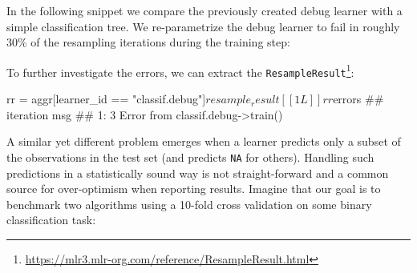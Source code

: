 \documentclass[12pt,]{scrbook}
\newenvironment{Shaded}{}{}
\newcommand{\DataTypeTok}[1]{#1}
\newcommand{\FloatTok}[1]{#1}
\newcommand{\KeywordTok}[1]{\textcolor[rgb]{0.00,0.00,1.00}{#1}}
\newcommand{\NormalTok}[1]{#1}
\newcommand{\OperatorTok}[1]{#1}
\newcommand{\OtherTok}[1]{\textcolor[rgb]{1.00,0.25,0.00}{#1}}
\newcommand{\StringTok}[1]{\textcolor[rgb]{0.00,0.50,0.50}{#1}}
\renewcommand{\href}[2]{#2\footnote{\url{#1}}}
\begin{document}
In the following snippet we compare the previously created debug learner with a simple classification tree.
We re-parametrize the debug learner to fail in roughly 30\% of the resampling iterations during the training step:

\begin{Shaded}
\end{Shaded}

To further investigate the errors, we can extract the \href{https://mlr3.mlr-org.com/reference/ResampleResult.html}{\texttt{ResampleResult}}:

\begin{Shaded}
\begin{Highlighting}[]
\NormalTok{rr =}\StringTok{ }\NormalTok{aggr[learner_id }\OperatorTok{==}\StringTok{ "classif.debug"}\NormalTok{]}\OperatorTok{$}\NormalTok{resample_result[[1L]]}
\NormalTok{rr}\OperatorTok{$}\NormalTok{errors}
\NormalTok{##    iteration                               msg}
\NormalTok{## 1:         3 Error from classif.debug->train()}
\end{Highlighting}
\end{Shaded}

A similar yet different problem emerges when a learner predicts only a subset of the observations in the test set (and predicts \texttt{NA} for others).
Handling such predictions in a statistically sound way is not straight-forward and a common source for over-optimism when reporting results.
Imagine that our goal is to benchmark two algorithms using a 10-fold cross validation on some binary classification task:
\end{document}

